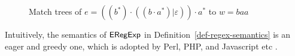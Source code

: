 \begin{example}
\begin{figure}[ht]
\caption{Match trees of $e=((b^\ast) \cdot ((b \cdot a^\ast) | \varepsilon)) \cdot a^\ast$ to $w= baa$}
\label{fig-regex-semantics}
\end{figure}
 \end{example}
  
 \begin{remark}
Intuitively, the semantics of ${\sf ERegExp}$ in Definition~\ref{def-regex-semantics} is an eager and greedy one, which is adopted by Perl, PHP, and Javascript etc \cite{MasterREbook}.
  \end{remark}
  
